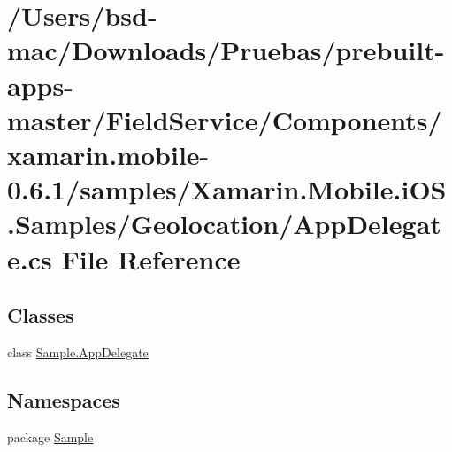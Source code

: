 \hypertarget{_components_2xamarin_8mobile-0_86_81_2samples_2_xamarin_8_mobile_8i_o_s_8_samples_2_geolocation_2_app_delegate_8cs}{\section{/\+Users/bsd-\/mac/\+Downloads/\+Pruebas/prebuilt-\/apps-\/master/\+Field\+Service/\+Components/xamarin.mobile-\/0.6.1/samples/\+Xamarin.Mobile.\+i\+O\+S.\+Samples/\+Geolocation/\+App\+Delegate.cs File Reference}
\label{_components_2xamarin_8mobile-0_86_81_2samples_2_xamarin_8_mobile_8i_o_s_8_samples_2_geolocation_2_app_delegate_8cs}
}
\subsection*{Classes}
\begin{DoxyCompactItemize}
\item 
class \hyperlink{class_sample_1_1_app_delegate}{Sample.\+App\+Delegate}
\end{DoxyCompactItemize}
\subsection*{Namespaces}
\begin{DoxyCompactItemize}
\item 
package \hyperlink{namespace_sample}{Sample}
\end{DoxyCompactItemize}
